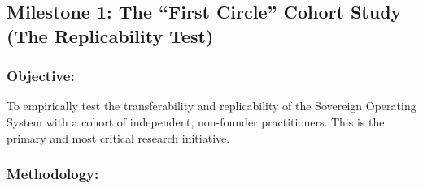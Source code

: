 \documentclass{article}
\begin{document}
\medskip

\subsection*{Milestone 1: The ``First Circle'' Cohort Study (The Replicability Test)}

\subsubsection*{Objective:} To empirically test the transferability and replicability of the Sovereign Operating System with a cohort of independent, non-founder practitioners. This is the primary and most critical research initiative.
\subsubsection*{Methodology:}
\end{document}
